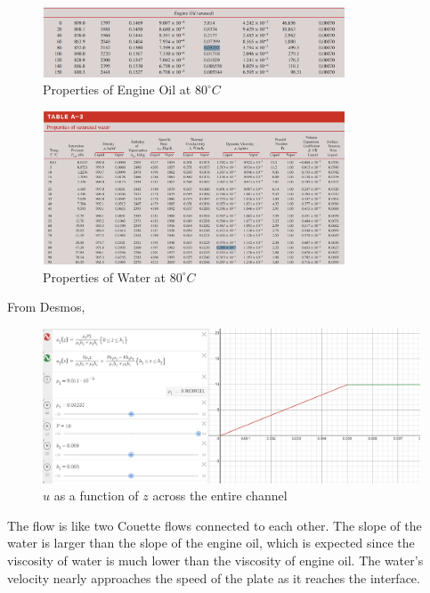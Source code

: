 \FloatBarrier
\begin{figure}[h]
    \centering
    \includegraphics[width=0.8\textwidth]{Questions/Figures/Q3 Engine Oil Properties.png}
    \caption{Properties of Engine Oil at $80^\circ C$}
\end{figure}
\begin{figure}[h]
    \centering
    \includegraphics[width=0.8\textwidth]{Questions/Figures/Q3 Water Properties.png}
    \caption{Properties of Water at $80^\circ C$}
\end{figure}
From Desmos,
\begin{figure}[h]
    \centering
    \includegraphics[width=1\textwidth]{Questions/Figures/Q3 Plot.png}
    \caption{$u$ as a function of $z$ across the entire channel}
\end{figure}
The flow is like two Couette flows connected to each other. The slope of the water is larger than the slope of the engine oil, which is expected since the viscosity of water is much lower than the viscosity of engine oil. The water's velocity nearly approaches the speed of the plate as it reaches the interface. 